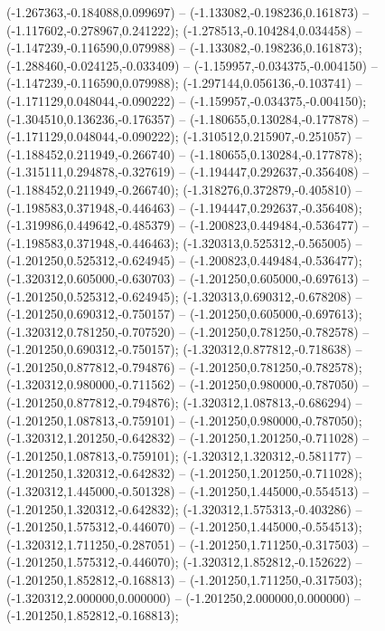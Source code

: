  (-1.267363,-0.184088,0.099697) -- (-1.133082,-0.198236,0.161873) -- (-1.117602,-0.278967,0.241222);
 (-1.278513,-0.104284,0.034458) -- (-1.147239,-0.116590,0.079988) -- (-1.133082,-0.198236,0.161873);
 (-1.288460,-0.024125,-0.033409) -- (-1.159957,-0.034375,-0.004150) -- (-1.147239,-0.116590,0.079988);
 (-1.297144,0.056136,-0.103741) -- (-1.171129,0.048044,-0.090222) -- (-1.159957,-0.034375,-0.004150);
 (-1.304510,0.136236,-0.176357) -- (-1.180655,0.130284,-0.177878) -- (-1.171129,0.048044,-0.090222);
 (-1.310512,0.215907,-0.251057) -- (-1.188452,0.211949,-0.266740) -- (-1.180655,0.130284,-0.177878);
 (-1.315111,0.294878,-0.327619) -- (-1.194447,0.292637,-0.356408) -- (-1.188452,0.211949,-0.266740);
 (-1.318276,0.372879,-0.405810) -- (-1.198583,0.371948,-0.446463) -- (-1.194447,0.292637,-0.356408);
 (-1.319986,0.449642,-0.485379) -- (-1.200823,0.449484,-0.536477) -- (-1.198583,0.371948,-0.446463);
 (-1.320313,0.525312,-0.565005) -- (-1.201250,0.525312,-0.624945) -- (-1.200823,0.449484,-0.536477);
 (-1.320312,0.605000,-0.630703) -- (-1.201250,0.605000,-0.697613) -- (-1.201250,0.525312,-0.624945);
 (-1.320313,0.690312,-0.678208) -- (-1.201250,0.690312,-0.750157) -- (-1.201250,0.605000,-0.697613);
 (-1.320312,0.781250,-0.707520) -- (-1.201250,0.781250,-0.782578) -- (-1.201250,0.690312,-0.750157);
 (-1.320312,0.877812,-0.718638) -- (-1.201250,0.877812,-0.794876) -- (-1.201250,0.781250,-0.782578);
 (-1.320312,0.980000,-0.711562) -- (-1.201250,0.980000,-0.787050) -- (-1.201250,0.877812,-0.794876);
 (-1.320312,1.087813,-0.686294) -- (-1.201250,1.087813,-0.759101) -- (-1.201250,0.980000,-0.787050);
 (-1.320312,1.201250,-0.642832) -- (-1.201250,1.201250,-0.711028) -- (-1.201250,1.087813,-0.759101);
 (-1.320312,1.320312,-0.581177) -- (-1.201250,1.320312,-0.642832) -- (-1.201250,1.201250,-0.711028);
 (-1.320312,1.445000,-0.501328) -- (-1.201250,1.445000,-0.554513) -- (-1.201250,1.320312,-0.642832);
 (-1.320312,1.575313,-0.403286) -- (-1.201250,1.575312,-0.446070) -- (-1.201250,1.445000,-0.554513);
 (-1.320312,1.711250,-0.287051) -- (-1.201250,1.711250,-0.317503) -- (-1.201250,1.575312,-0.446070);
 (-1.320312,1.852812,-0.152622) -- (-1.201250,1.852812,-0.168813) -- (-1.201250,1.711250,-0.317503);
 (-1.320312,2.000000,0.000000) -- (-1.201250,2.000000,0.000000) -- (-1.201250,1.852812,-0.168813);

